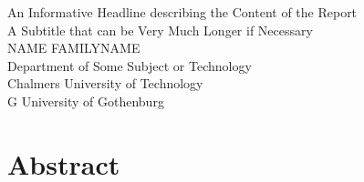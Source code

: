 An Informative Headline describing the Content of the Report\\
A Subtitle that can be Very Much Longer if Necessary\\
NAME FAMILYNAME\\
Department of Some Subject or Technology\\
Chalmers University of Technology\\
\if\InstitutionLocation G
University of Gothenburg\\
\fi
\setlength{\parskip}{0.5cm}

\thispagestyle{plain}			%
\setlength{\parskip}{0pt plus 1.0pt}
\section*{Abstract}

